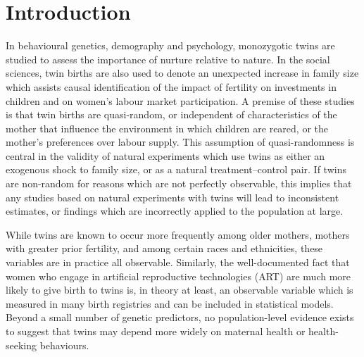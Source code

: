 \documentclass[11pt]{article}
\begin{document}
\newpage
\section*{Introduction}
In behavioural genetics, demography and psychology, monozygotic twins are studied to assess the importance of nurture relative to nature\cite{Thorndike1905,Boomsmaetal2002,Poldermanetal2015,Phillips1993,BouchardPropping1993,McClearnetal1997,Nisen2013}. In the social sciences, twin births are also used to denote an unexpected increase in family size which assists causal identification of the impact of fertility on investments in children and on women's labour market participation\cite{WolpinRosenzweig2000,RosenzweigWolpin1980,BronarsGrogger1994}. A premise of these studies is that twin births are quasi-random, or independent of characteristics of the mother that influence the environment in which children are reared, or the mother's preferences over labour supply.  This assumption of quasi-randomness is central in the validity of natural experiments which use twins as either an exogenous shock to family size, or as a natural treatment--control pair.  If twins are non-random for reasons which are not perfectly observable, this implies that any studies based on natural experiments with twins will lead to inconsistent estimates, or findings which are incorrectly applied to the population at large.

While twins are known to occur more frequently among older mothers, mothers with greater prior fertility, and among certain races and ethnicities\cite{Hall2003}, these variables are in practice all observable.  Similarly, the well-documented fact that women who engage in artificial reproductive technologies (ART) are much more likely to give birth to twins\cite{Vitthalaetal2009} is, in theory at least, an observable variable which is measured in many birth registries and can be included in statistical models.  Beyond a small number of genetic predictors, no population-level evidence exists to suggest that twins may depend more widely on maternal health or health-seeking behaviours.
\end{document}
